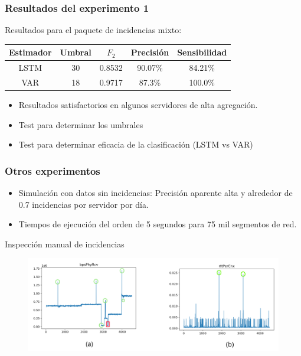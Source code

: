 \documentclass{beamer}
\begin{document}
\begin{frame}
\frametitle{Resultados del experimento 1}
Resultados para el paquete de incidencias mixto:
\begin{table}{}
	\begin{center}
		\begin{tabular}{ | c || c | c | c | c |  }
			\hline
			Estimador & Umbral & $ F_2 $ & Precisión & Sensibilidad \\
			\hline
			LSTM & 30 & 0.8532 & 90.07\% & 84.21\% \\
			VAR & 18 & 0.9717 & 87.3\% & 100.0\% \\
			\hline
		\end{tabular}
	\end{center}
\end{table}

\begin{itemize}
\item Resultados satisfactorios en algunos servidores de alta agregación.
\item Test para determinar los umbrales
\item Test para determinar eficacia de la clasificación (LSTM vs VAR)
\end{itemize}

\end{frame}

\begin{frame}
\frametitle{Otros experimentos}

\begin{itemize}
\item Simulación con datos sin incidencias: Precisión aparente alta y alrededor de 0.7 incidencias por servidor por día.
\item Tiempos de ejecución del orden de 5 segundos para 75 mil segmentos de red.
\end{itemize}

\begin{block}{Inspección manual de incidencias}
\begin{figure}
\includegraphics[scale=0.3]{imagenes/manual.pdf} 
\end{figure}
\end{block}
\end{frame}
 
\end{document}
